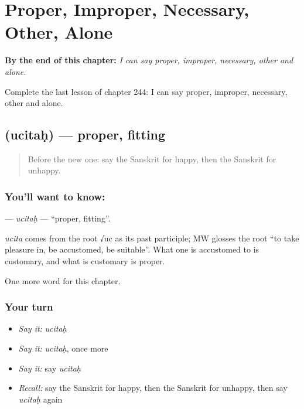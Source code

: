 
\chapter{Proper, Improper, Necessary, Other, Alone}
\label{ch:sa-proper-improper-necessary-other-alone}

\begin{chapteropening}
\textbf{By the end of this chapter:} \emph{I can say proper, improper, necessary, other and alone.}

Complete the last lesson of chapter 244: I can say proper, improper, necessary, other and alone.
\end{chapteropening}

\section[\texorpdfstring{\sk{उचितः} (ucitaḥ)}{उचितः (ucitaḥ)}]{ (ucitaḥ) — proper, fitting}

\label{lesson:SA-C244-ucitah}



\begin{quote}
Before the new one: say the Sanskrit for happy, then the Sanskrit for unhappy.
\end{quote}

\subsection*{You'll want to know: }
\textbf{} — \emph{ucitaḥ} — \textquotedblleft{}proper, fitting\textquotedblright{}.

\begin{cousinweb}
\emph{ucita} comes from the root √uc as its past participle; MW glosses the root \textquotedblleft{}to take pleasure in, be accustomed, be suitable\textquotedblright{}. What one is accustomed to is customary, and what is customary is proper.
\end{cousinweb}

\begin{grammarlens}[title={What you've built}]
One more word for this chapter.
\end{grammarlens}

\subsection*{Your turn}
\begin{itemize}
\raggedright
  \item \emph{Say it:} \emph{ucitaḥ}
  \item \emph{Say it:} \emph{ucitaḥ}, once more
  \item \emph{Say it:} say \emph{ucitaḥ}
  \item \emph{Recall:} say the Sanskrit for happy, then the Sanskrit for unhappy, then say \emph{ucitaḥ} again
\end{itemize}

